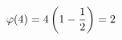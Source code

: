 \documentclass[preview]{standalone}
\begin{document}
\begin{align*}
\special{dvisvgm:raw <g id='unique000'>}\varphi(4) = 4 \left( 1 - \frac{1}{2} \right) = 2\special{dvisvgm:raw </g>}
\end{align*}
\end{document}
